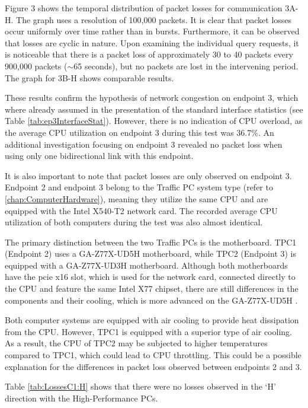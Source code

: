 Figure 3 shows the temporal distribution of packet losses for communication 3A-H. The graph uses a resolution of 100,000 packets.  It is clear that packet losses occur uniformly over time rather than in bursts. Furthermore, it can be observed that losses are cyclic in nature. Upon examining the individual query requests, it is noticeable that there is a packet loss of approximately 30 to 40 packets every 900,000 packets ($\sim$65 seconds), but no packets are lost in the intervening period. The graph for 3B-H shows comparable results.

These results confirm the hypothesis of network congestion on endpoint 3, which where already assumed in the presentation of the standard interface statistics (see Table \ref{tab:ep3InterfaceStat}). However, there is no indication of \ac{CPU} overload, as the average \ac{CPU} utilization on endpoint 3 during this test was 36.7\%. An additional investigation focusing on endpoint 3 revealed no packet loss when using only one bidirectional link with this endpoint.

It is also important to note that packet losses are only observed on endpoint 3. Endpoint 2 and endpoint 3 belong to the Traffic PC system type (refer to \ref{chap:ComputerHardware}), meaning they utilize the same \ac{CPU} and are equipped with the Intel X540-T2 network card. The recorded average \ac{CPU} utilization of both computers during the test  was also almost identical.

The primary distinction between the two Traffic PCs is the motherboard. TPC1 (Endpoint 2) uses a GA-Z77X-UD5H motherboard, while TPC2 (Endpoint 3) is equipped with a GA-Z77X-UD3H motherboard. Although both motherboards have the \ac{pcie} x16 slot, which is used for the network card, connected directly to the \ac{CPU} and feature the same Intel X77 chipset, there are still differences in the components and their cooling, which is more advanced on the GA-Z77X-UD5H \cite{reli04, reli05}.

Both computer systems are equipped with air cooling to provide heat dissipation from the \ac{CPU}. However, TPC1 is equipped with a superior type of air cooling. As a result, the \ac{CPU} of TPC2 may be subjected to higher temperatures compared to TPC1, which could lead to \ac{CPU} throttling. This could be a possible explanation for the differences in packet loss observed between endpoints 2 and 3.

Table \ref{tab:LossesC1:H} shows that there were no losses observed in the `H' direction with the High-Performance PCs.


